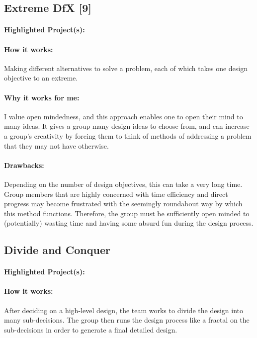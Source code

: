 \documentclass[a4paper,12pt]{article}
\begin{document}
\subsection{Extreme DfX [9]}
\paragraph{Highlighted Project(s): }
\paragraph{How it works: }
Making different alternatives to solve a problem, each of which takes one design objective to an extreme.

\paragraph{Why it works for me: }
I value open mindedness, and this approach enables one to open their mind to many ideas. It gives a group many design ideas to choose from, and can increase a group’s creativity by forcing them to think of methods of addressing a problem that they may not have otherwise.

\paragraph{Drawbacks: }
Depending on the number of design objectives, this can take a very long time. Group members that are highly concerned with time efficiency and direct progress may become frustrated with the seemingly roundabout way by which this method functions. Therefore, the group must be sufficiently open minded to (potentially) wasting time and having some absurd fun during the design process.

\subsection{Divide and Conquer}
\paragraph{Highlighted Project(s): }
\paragraph{How it works: }
After deciding on a high-level design, the team works to divide the design into many sub-decisions. The group then runs the design process like a fractal on the sub-decisions in order to generate a final detailed design.
\end{document}

